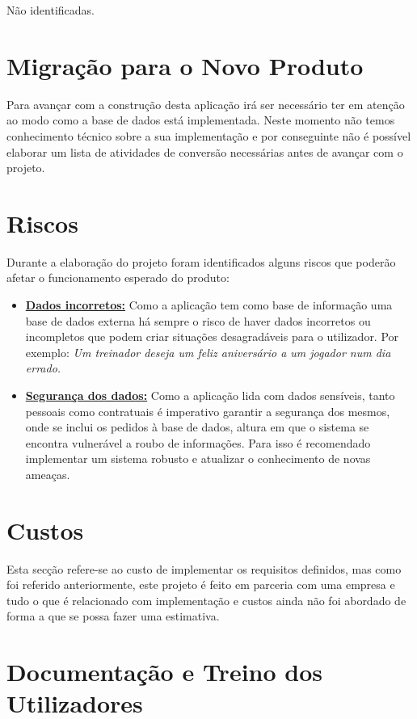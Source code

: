 Não identificadas.

\section{Migração para o Novo Produto}

Para avançar com a construção desta aplicação irá ser necessário ter em atenção ao modo como a base de dados está implementada. Neste momento não temos conhecimento técnico sobre a sua implementação e por conseguinte não é possível elaborar um lista de atividades de conversão necessárias antes de avançar com o projeto.

\section{Riscos}

Durante a elaboração do projeto foram identificados alguns riscos que poderão afetar o funcionamento esperado do produto:
\begin{itemize}
    \item \underline{\bf{Dados incorretos:}} Como a aplicação tem como base de informação uma base de dados externa há sempre o risco de haver dados incorretos ou incompletos que podem criar situações desagradáveis para o utilizador. Por exemplo: \emph{Um treinador deseja um feliz aniversário a um jogador num dia errado.}
    
    \item \underline{\bf{Segurança dos dados:}} Como a aplicação lida com dados sensíveis, tanto pessoais como contratuais é imperativo garantir a segurança dos mesmos, onde se inclui os pedidos à base de dados, altura em que o sistema se encontra vulnerável a roubo de informações. Para isso é recomendado implementar um sistema robusto e atualizar o conhecimento de novas ameaças.
 
\end{itemize}

\section{Custos}

Esta secção refere-se ao custo de implementar os requisitos definidos, mas como foi referido anteriormente, este projeto é feito em parceria com uma empresa e tudo o que é relacionado com implementação e custos ainda não foi abordado de forma a que se possa fazer uma estimativa.

\section{Documentação e Treino dos Utilizadores}

